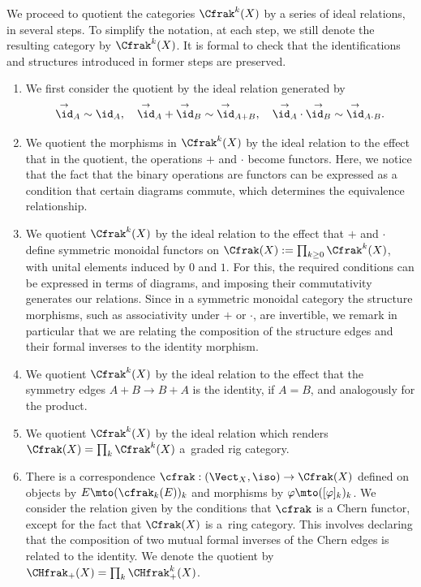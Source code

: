 We proceed to quotient the categories $\Cfrak^{k}(X)$ by a series of ideal relations, in several steps. To simplify the notation, at each step, we still denote the resulting category by $\Cfrak^{k}(X)$. It is formal to check that the identifications and structures introduced in former steps are preserved.
\begin{enumerate}
\item We first consider the quotient by the ideal relation generated by
\begin{displaymath}
\overset{\to}{\id}_{A} \sim \id_A,\quad \overset{\to}{\id}_A + \overset{\to}{\id}_B \sim \overset{\to}\id_{A + B},\quad \overset{\to}{\id_A}\cdot \overset{\to}{\id_B} \sim \overset{\to}\id_{A\cdot B}.
\end{displaymath}
\item We quotient the morphisms in $\Cfrak^{k}(X)$ by the ideal relation to the effect that in the quotient, the operations $+$ and $\cdot$
become functors. Here, we notice that the fact that the binary operations are functors can be expressed as a condition that certain diagrams commute, which determines the equivalence relationship.
\item We quotient $\Cfrak^{k}(X)$ by the ideal relation to the effect that $+$ and $\cdot$ define symmetric monoidal functors on $\Cfrak(X):=\prod_{k\geq 0}\Cfrak^{k}(X)$, with unital elements induced by $0$ and $1$. For this, the required conditions can be expressed in terms of diagrams, and imposing their commutativity generates our relations. Since in a symmetric monoidal category the structure morphisms, such as associativity under $+$ or $\cdot$, are invertible, we remark in particular that we are relating the composition of the structure edges and their formal inverses to the identity morphism.
\item We quotient $\Cfrak^{k}(X)$ by the ideal relation to the effect that the symmetry edges $A + B \to B + A$ is the identity, if $A = B$, and analogously for the product.
\item We quotient $\Cfrak^k(X)$ by the ideal relation which renders $\Cfrak(X)=\prod_k \Cfrak^k(X)$ a~graded rig category.
\item There is a correspondence $\cfrak : (\Vect_X, \iso) \to \Cfrak(X)$ defined on objects by $E \mto (\cfrak_k(E))_k$ and morphisms by $\varphi \mto ([\varphi]_k)_{k}$. We consider the relation given by the conditions that $\cfrak$ is a Chern functor, except for the fact that $\Cfrak(X)$ is a~ring category. This involves declaring that the composition of two mutual formal inverses of the Chern edges is related to the identity. We denote the quotient by $\CHfrak_{+}(X)=\prod_{k}\CHfrak^{k}_{+}(X)$.
\end{enumerate}

